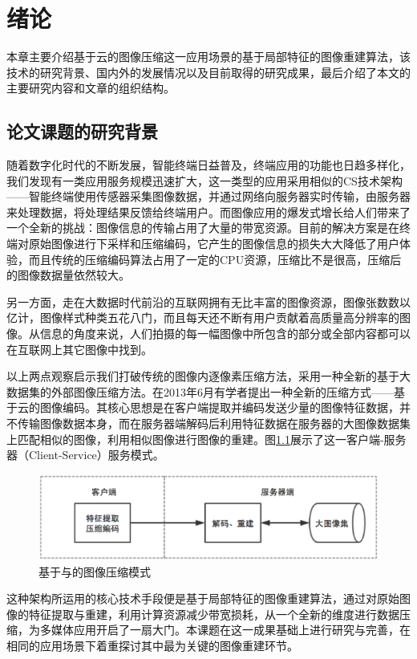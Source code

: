 
\chapter{绪论}
本章主要介绍基于云的图像压缩这一应用场景的基于局部特征的图像重建算法，该技术的研究背景、国内外的发展情况以及目前取得的研究成果，最后介绍了本文的主要研究内容和文章的组织结构。


\section{论文课题的研究背景}

随着数字化时代的不断发展，智能终端日益普及，终端应用的功能也日趋多样化，我们发现有一类应用服务规模迅速扩大，这一类型的应用采用相似的CS技术架构——智能终端使用传感器采集图像数据，并通过网络向服务器实时传输，由服务器来处理数据，将处理结果反馈给终端用户。而图像应用的爆发式增长给人们带来了一个全新的挑战：图像信息的传输占用了大量的带宽资源。目前的解决方案是在终端对原始图像进行下采样和压缩编码，它产生的图像信息的损失大大降低了用户体验，而且传统的压缩编码算法占用了一定的CPU资源，压缩比不是很高，压缩后的图像数据量依然较大。

另一方面，走在大数据时代前沿的互联网拥有无比丰富的图像资源，图像张数数以亿计，图像样式种类五花八门，而且每天还不断有用户贡献着高质量高分辨率的图像。从信息的角度来说，人们拍摄的每一幅图像中所包含的部分或全部内容都可以在互联网上其它图像中找到。

以上两点观察启示我们打破传统的图像内逐像素压缩方法，采用一种全新的基于大数据集的外部图像压缩方法。在2013年6月有学者\cite{Yue:2013gl}提出一种全新的压缩方式——基于云的图像编码。其核心思想是在客户端提取并编码发送少量的图像特征数据，并不传输图像数据本身，而在服务器端解码后利用特征数据在服务器的大图像数据集上匹配相似的图像，利用相似图像进行图像的重建。图\ref{fig:overview}展示了这一客户端-服务器（Client-Service）服务模式。
\begin{figure}
\centering\includegraphics[width=14cm]{imgs/ch1/overview}
\caption{基于与的图像压缩模式}
\label{fig:overview}
\end{figure}
这种架构所运用的核心技术手段便是基于局部特征的图像重建算法，通过对原始图像的特征提取与重建，利用计算资源减少带宽损耗，从一个全新的维度进行数据压缩，为多媒体应用开启了一扇大门。本课题在这一成果基础上进行研究与完善，在相同的应用场景下着重探讨其中最为关键的图像重建环节。

